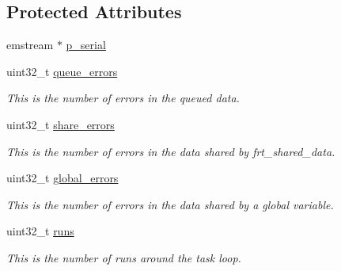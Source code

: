 \subsection*{Protected Attributes}
\begin{DoxyCompactItemize}
\item 
emstream $\ast$ \hyperlink{classtask__sink_a5be4e7bc37be54c830b3b6506e4db228}{p\+\_\+serial}
\item 
\hypertarget{classtask__sink_a54a5f4b35917d43023ea9cfdbe32c476}{uint32\+\_\+t \hyperlink{classtask__sink_a54a5f4b35917d43023ea9cfdbe32c476}{queue\+\_\+errors}}\label{classtask__sink_a54a5f4b35917d43023ea9cfdbe32c476}

\begin{DoxyCompactList}\small\item\em This is the number of errors in the queued data. \end{DoxyCompactList}\item 
\hypertarget{classtask__sink_ab6a9c33c4bd8f29f132aa48d401006c1}{uint32\+\_\+t \hyperlink{classtask__sink_ab6a9c33c4bd8f29f132aa48d401006c1}{share\+\_\+errors}}\label{classtask__sink_ab6a9c33c4bd8f29f132aa48d401006c1}

\begin{DoxyCompactList}\small\item\em This is the number of errors in the data shared by frt\+\_\+shared\+\_\+data. \end{DoxyCompactList}\item 
\hypertarget{classtask__sink_a7f9226aad37d173f2a4a8984dd75a2ff}{uint32\+\_\+t \hyperlink{classtask__sink_a7f9226aad37d173f2a4a8984dd75a2ff}{global\+\_\+errors}}\label{classtask__sink_a7f9226aad37d173f2a4a8984dd75a2ff}

\begin{DoxyCompactList}\small\item\em This is the number of errors in the data shared by a global variable. \end{DoxyCompactList}\item 
\hypertarget{classtask__sink_a7a6ec91711e4a788668044c5a9f9f96a}{uint32\+\_\+t \hyperlink{classtask__sink_a7a6ec91711e4a788668044c5a9f9f96a}{runs}}\label{classtask__sink_a7a6ec91711e4a788668044c5a9f9f96a}

\begin{DoxyCompactList}\small\item\em This is the number of runs around the task loop. \end{DoxyCompactList}\end{DoxyCompactItemize}


